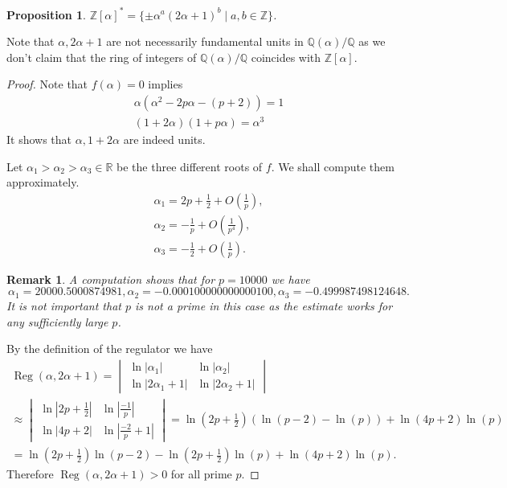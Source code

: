 \documentclass[a4paper]{article}
\newtheorem{Prop}[Thm]{Proposition}
\newtheorem{Rem}[Thm]{Remark}
\newcommand{\R}{\mathbb{R}}        %
\newcommand{\Q}{\mathbb{Q}}        %
\DeclareMathOperator{\Reg}{Reg}        %
\begin{document}
\begin{Prop}
	\label{prop_multiplicative_group_structure}
$\mathbb{Z}[\alpha]^{*} = \{ \pm \alpha^a (2\alpha + 1)^b \mid a, b \in \mathbb{Z} \} $.
\end{Prop}
Note that $\alpha, 2\alpha + 1$ are not necessarily fundamental units in $\Q(\alpha)/\Q$ as we don't claim that the ring of integers of $\Q(\alpha) / \Q$ coincides with $\mathbb{Z}[\alpha]$.
\begin{proof}
Note that $f(\alpha) = 0$ implies 
\begin{gather}
\alpha (\alpha^2 - 2p \alpha - (p + 2)) = 1
\\
\label{equation_units}
(1 + 2 \alpha) (1 + p \alpha) = \alpha^3
\end{gather}
It shows that $\alpha, 1 + 2 \alpha$ are indeed units.

Let $\alpha_1 > \alpha_2 > \alpha_3 \in \R$ be the three different roots of $f$.
We shall compute them approximately.
\begin{gather*}
\alpha_1 = 2 p + \frac{1}{2} + O\left(\frac{1}{p}\right), \\
\alpha_2 = - \frac{1}{ p } + O\left(\frac{1}{p^4}\right), \\
\alpha_3 = - \frac{1}{2} + O\left(\frac{1}{p}\right)
.\end{gather*}
\begin{Rem}




A computation shows that for $p = 10000$
we have
 \[
\alpha_1 = 20000.5000874981 ,
\alpha_2 = -0.000100000000000100 ,
\alpha_3 = -0.499987498124648 
.\] 
It is not important that $p$ is not a prime in this case as the estimate works for any sufficiently large $p$.
\end{Rem}

By the definition of the regulator we have
\begin{multline}
\Reg(\alpha, 2\alpha + 1) = 
\begin{vmatrix}
\ln |\alpha_1| 		& \ln |\alpha_2| \\
\ln |2 \alpha_1 + 1| 	& \ln |2 \alpha_2 + 1|
\end{vmatrix} 
\\
\approx
\begin{vmatrix}
\ln |2p + \frac{1}{2}| 	& \ln |\frac{-1}{p}| \\
\ln |4 p + 2| 	& \ln |\frac{-2}{p} + 1|
\end{vmatrix}
=
\ln(2p + \frac{1}{2})
(\ln(p - 2) - \ln(p))
+
\ln(4p + 2) \ln(p)
\\
=
\ln(2 p + \frac{1}{2}) \ln(p - 2) - \ln(2 p + \frac{1}{2}) \ln(p) + \ln(4p + 2) \ln(p)
.\end{multline}
Therefore $ \Reg(\alpha, 2\alpha + 1) > 0 $ for all prime $p$.


\end{proof}
\end{document}
